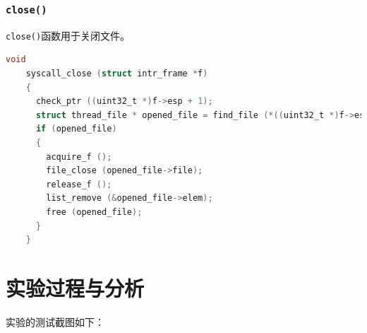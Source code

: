 \documentclass{article}
\begin{document}
\subsubsection{\texttt{close()}}

\texttt{close()}函数用于关闭文件。

\begin{lstlisting}[language=C, title=\texttt{src/userprog/syscall.c - syscall\_close()}]
    void
    syscall_close (struct intr_frame *f)
    {
      check_ptr ((uint32_t *)f->esp + 1);
      struct thread_file * opened_file = find_file (*((uint32_t *)f->esp + 1));
      if (opened_file)
      {
        acquire_f ();
        file_close (opened_file->file);
        release_f ();
        list_remove (&opened_file->elem);
        free (opened_file);
      }
    }
\end{lstlisting}
\section{实验过程与分析}

实验的测试截图如下：
\end{document}

